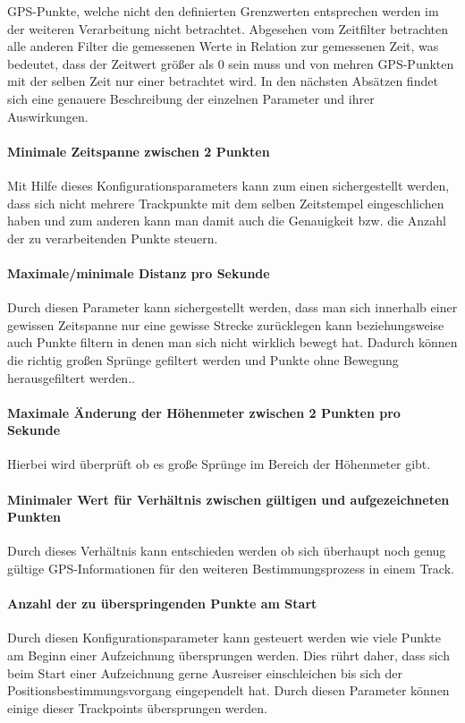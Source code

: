 GPS-Punkte, welche nicht den definierten Grenzwerten entsprechen werden im der weiteren Verarbeitung nicht betrachtet. Abgesehen vom Zeitfilter betrachten alle anderen Filter die gemessenen Werte in Relation zur gemessenen Zeit, was bedeutet, dass der Zeitwert größer als 0 sein muss und von mehren GPS-Punkten mit der selben Zeit nur einer betrachtet wird. In den nächsten Absätzen findet sich eine genauere Beschreibung der einzelnen Parameter und ihrer Auswirkungen.

\paragraph{Minimale Zeitspanne zwischen 2 Punkten} Mit Hilfe dieses Konfigurationsparameters kann zum einen sichergestellt werden, dass sich nicht mehrere Trackpunkte mit dem selben Zeitstempel eingeschlichen haben und zum anderen kann man damit auch die Genauigkeit bzw. die Anzahl der zu verarbeitenden Punkte steuern.

\paragraph{Maximale/minimale Distanz pro Sekunde} Durch diesen Parameter kann sichergestellt werden, dass man sich innerhalb einer gewissen Zeitspanne nur eine gewisse Strecke zurücklegen kann beziehungsweise auch Punkte filtern in denen man sich nicht wirklich bewegt hat. Dadurch können die richtig großen Sprünge gefiltert werden und Punkte ohne Bewegung herausgefiltert werden..

\paragraph{Maximale Änderung der Höhenmeter zwischen 2 Punkten pro Sekunde} Hierbei wird überprüft ob es große Sprünge im Bereich der Höhenmeter gibt. 

\paragraph{Minimaler Wert für Verhältnis zwischen gültigen und aufgezeichneten Punkten} Durch dieses Verhältnis kann entschieden werden ob sich überhaupt noch genug gültige GPS-Informationen für den weiteren Bestimmungsprozess in einem Track.

\paragraph{Anzahl der zu überspringenden Punkte am Start} Durch diesen Konfigurationsparameter kann gesteuert werden wie viele Punkte am Beginn einer Aufzeichnung übersprungen werden. Dies rührt daher, dass sich beim Start einer Aufzeichnung gerne Ausreiser einschleichen bis sich der Positionsbestimmungsvorgang eingependelt hat. Durch diesen Parameter können einige dieser Trackpoints übersprungen werden.


